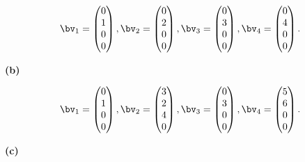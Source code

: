 \documentclass[oneside,12pt]{amsart}
\begin{document}
$$
\bv_1 =
\begin{pmatrix}
0 \\ 1 \\ 0 \\ 0
\end{pmatrix},
\bv_2 =
\begin{pmatrix}
0 \\ 2 \\ 0 \\ 0
\end{pmatrix},
\bv_3 =
\begin{pmatrix}
0 \\ 3 \\ 0 \\ 0
\end{pmatrix},
\bv_4 =
\begin{pmatrix}
0 \\ 4 \\ 0 \\ 0
\end{pmatrix}.
$$

\bigskip
\bigskip
\bigskip
\bigskip
\bigskip
\bigskip
\bigskip
\bigskip
\bigskip
\bigskip
\bigskip
\bigskip

\textbf{(b)}

$$
\bv_1 =
\begin{pmatrix}
0 \\ 1 \\ 0 \\ 0
\end{pmatrix},
\bv_2 =
\begin{pmatrix}
3 \\ 2 \\ 4 \\ 0
\end{pmatrix},
\bv_3 =
\begin{pmatrix}
0 \\ 3 \\ 0 \\ 0
\end{pmatrix},
\bv_4 =
\begin{pmatrix}
5 \\ 6 \\ 0 \\ 0
\end{pmatrix}.
$$

\bigskip
\bigskip
\bigskip
\bigskip
\bigskip
\bigskip
\bigskip
\bigskip
\bigskip
\bigskip
\bigskip
\bigskip

\textbf{(c)}
\end{document}
